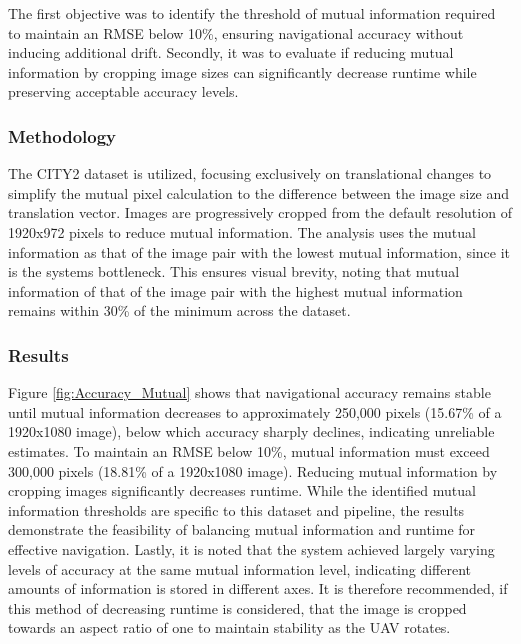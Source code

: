 The first objective was to identify the threshold of mutual information required to maintain an RMSE below 10\%, ensuring navigational accuracy without inducing additional drift. Secondly, it was to evaluate if reducing mutual information by cropping image sizes can significantly decrease runtime while preserving acceptable accuracy levels.

\subsubsection{Methodology}

The CITY2 dataset is utilized, focusing exclusively on translational changes to simplify the mutual pixel calculation to the difference between the image size and translation vector. Images are progressively cropped from the default resolution of 1920x972 pixels to reduce mutual information. The analysis uses the mutual information as that of the image pair with the lowest mutual information, since it is the systems bottleneck. This ensures visual brevity, noting that mutual information of that of the image pair with the highest mutual information remains within 30\% of the minimum across the dataset.

\subsubsection{Results}

Figure \ref{fig:Accuracy_Mutual} shows that navigational accuracy remains stable until mutual information decreases to approximately 250,000 pixels (15.67\% of a 1920x1080 image), below which accuracy sharply declines, indicating unreliable estimates. To maintain an RMSE below 10\%, mutual information must exceed 300,000 pixels (18.81\% of a 1920x1080 image). Reducing mutual information by cropping images significantly decreases runtime. While the identified mutual information thresholds are specific to this dataset and pipeline, the results demonstrate the feasibility of balancing mutual information and runtime for effective navigation. Lastly, it is noted that the system achieved largely varying levels of accuracy at the same mutual information level, indicating different amounts of information is stored in different axes. It is therefore recommended, if this method of decreasing runtime is considered, that the image is cropped towards an aspect ratio of one to maintain stability as the UAV rotates.


